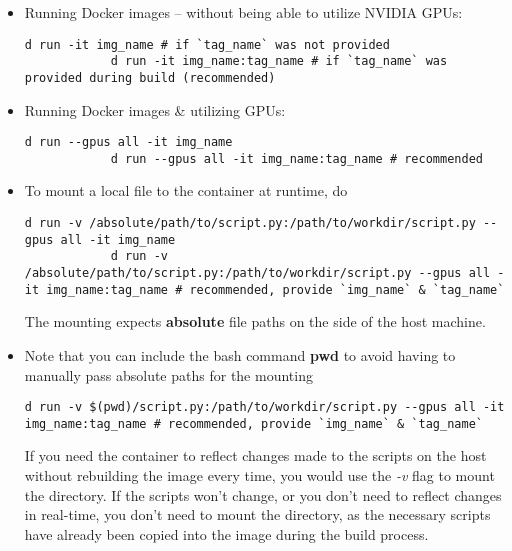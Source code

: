 \documentclass[12pt, a4paper]{scrbook}
\numberwithin{equation}{section}
\theoremstyle{definition}
\theoremstyle{definition}
\begin{document}
	\begin{itemize} 
		
		\item Running Docker images -- without being able to utilize NVIDIA GPUs:
		
		\begin{lstlisting}[style=mystylebash, label=alg:docker_run, xleftmargin=\parindent]
			d run -it img_name # if `tag_name` was not provided
			d run -it img_name:tag_name # if `tag_name` was provided during build (recommended)
		\end{lstlisting}
		
		\item Running Docker images \& utilizing GPUs: 
		
		\begin{lstlisting}[style=mystylebash, label=alg:docker_run_gpus, xleftmargin=\parindent]
			d run --gpus all -it img_name 
			d run --gpus all -it img_name:tag_name # recommended
		\end{lstlisting}
		
		\item To mount a local file to the container at runtime, do
		
		\begin{lstlisting}[style=mystylebash, label=alg:docker__run_volume_mounting, xleftmargin=\parindent]
			d run -v /absolute/path/to/script.py:/path/to/workdir/script.py --gpus all -it img_name 
			d run -v /absolute/path/to/script.py:/path/to/workdir/script.py --gpus all -it img_name:tag_name # recommended, provide `img_name` & `tag_name`
		\end{lstlisting}
		
		The mounting expects \textbf{absolute} file paths on the side of the host machine.
		
		\item Note that you can include the bash command \textbf{pwd} to avoid having to manually pass absolute paths for the mounting
		
		\begin{lstlisting}[style=mystylebash, label=alg:docker_run__with_pwd, xleftmargin=\parindent]
			d run -v $(pwd)/script.py:/path/to/workdir/script.py --gpus all -it img_name:tag_name # recommended, provide `img_name` & `tag_name`
		\end{lstlisting}
		
		If you need the container to reflect changes made to the scripts on the host without rebuilding the image every time, you would use the \textit{-v} flag to mount the directory. If the scripts won't change, or you don't need to reflect changes in real-time, you don't need to mount the directory, as the necessary scripts have already been copied into the image during the build process.
		

\end{itemize}
\end{document}
